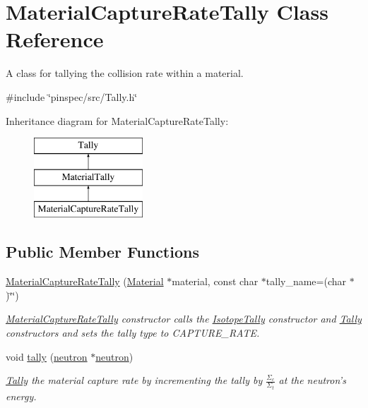 \hypertarget{classMaterialCaptureRateTally}{\section{Material\-Capture\-Rate\-Tally Class Reference}
\label{classMaterialCaptureRateTally}
}


A class for tallying the collision rate within a material.  




{\ttfamily \#include \char`\"{}pinspec/src/\-Tally.\-h\char`\"{}}

Inheritance diagram for Material\-Capture\-Rate\-Tally\-:\begin{figure}[H]
\begin{center}
\leavevmode
\includegraphics[height=3.000000cm]{classMaterialCaptureRateTally}
\end{center}
\end{figure}
\subsection*{Public Member Functions}
\begin{DoxyCompactItemize}
\item 
\hyperlink{classMaterialCaptureRateTally_ae2bad9a005cc081903041dd4675a2823}{Material\-Capture\-Rate\-Tally} (\hyperlink{classMaterial}{Material} $\ast$material, const char $\ast$tally\-\_\-name=(char $\ast$)\char`\"{}\char`\"{})
\begin{DoxyCompactList}\small\item\em \hyperlink{classMaterialCaptureRateTally}{Material\-Capture\-Rate\-Tally} constructor calls the \hyperlink{classIsotopeTally}{Isotope\-Tally} constructor and \hyperlink{classTally}{Tally} constructors and sets the tally type to C\-A\-P\-T\-U\-R\-E\-\_\-\-R\-A\-T\-E. \end{DoxyCompactList}\item 
void \hyperlink{classMaterialCaptureRateTally_a786889f9b19e47868b05b065920283e6}{tally} (\hyperlink{structneutron}{neutron} $\ast$\hyperlink{structneutron}{neutron})
\begin{DoxyCompactList}\small\item\em \hyperlink{classTally}{Tally} the material capture rate by incrementing the tally by $ \frac{\Sigma_c}{\Sigma_t} $ at the neutron's energy. \end{DoxyCompactList}\end{DoxyCompactItemize}
